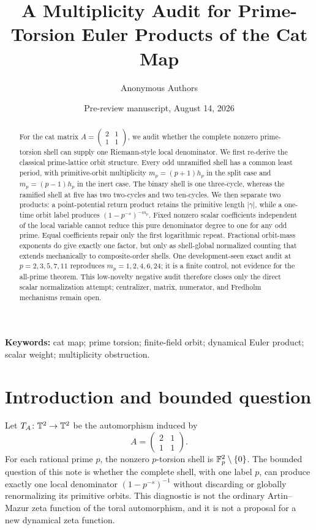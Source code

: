 \documentclass[11pt]{article}
\title{A Multiplicity Audit for Prime-Torsion Euler Products of the Cat Map}
\author{Anonymous Authors}
\date{Pre-review manuscript, August 14, 2026}
\theoremstyle{definition}
\theoremstyle{remark}
\begin{document}
\maketitle

\begin{abstract}
For the cat matrix
\(A=\left(\begin{smallmatrix}2&1\\1&1\end{smallmatrix}\right)\),
we audit whether the complete nonzero prime-torsion shell can supply one
Riemann-style local denominator.  We first re-derive the classical
prime-lattice orbit structure.  Every odd unramified shell has a common
least period, with primitive-orbit multiplicity
\(m_p=(p+1)h_p\) in the split case and
\(m_p=(p-1)h_p\) in the inert case.  The binary shell is one three-cycle,
whereas the ramified shell at five has two two-cycles and two ten-cycles.
We then separate two products: a point-potential return product retains the
primitive length \(|\gamma|\), while a one-time orbit label produces
\((1-p^{-s})^{-m_p}\).  Fixed nonzero scalar coefficients independent of
the local variable cannot reduce this pure denominator degree to one for
any odd prime.  Equal coefficients repair only the first logarithmic
repeat.  Fractional orbit-mass exponents do give exactly one factor, but
only as shell-global normalized counting that extends mechanically to
composite-order shells.  One development-seen exact audit at
\(p=2,3,5,7,11\) reproduces \(m_p=1,2,4,6,24\); it is a finite control,
not evidence for the all-prime theorem.  This low-novelty negative audit
therefore closes only the direct scalar normalization attempt; centralizer,
matrix, numerator, and Fredholm mechanisms remain open.
\end{abstract}

\noindent\textbf{Keywords:} cat map; prime torsion; finite-field orbit;
dynamical Euler product; scalar weight; multiplicity obstruction.

\section{Introduction and bounded question}
\label{sec:introduction}

Let \(T_A\colon\mathbb{T}^{2}\to\mathbb{T}^{2}\) be the automorphism induced by
\begin{equation}
  A=\begin{pmatrix}2&1\\1&1\end{pmatrix}.
  \label{eq:cat-matrix}
\end{equation}
For each rational prime \(p\), the nonzero \(p\)-torsion shell is
\(\mathbb{F}_p^2\setminus\{0\}\).  The bounded question of this note is whether
the complete shell, with one label \(p\), can produce exactly one local
denominator \((1-p^{-s})^{-1}\) without discarding or globally renormalizing
its primitive orbits.  This diagnostic is not the ordinary Artin--Mazur
zeta function of the toral automorphism, and it is not a proposal for a new
dynamical zeta function.
\end{document}
